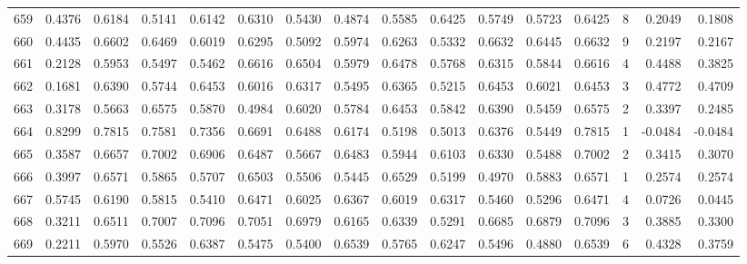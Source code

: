 \begin{tabular}{lrrrrrrrrrrrrrrr}
659 &      0.4376 &  0.6184 &  0.5141 &  0.6142 &  0.6310 &  0.5430 &  0.4874 &  0.5585 &  0.6425 &  0.5749 &   0.5723 &     0.6425 &      8 &                    0.2049 &                     0.1808 \\
660 &      0.4435 &  0.6602 &  0.6469 &  0.6019 &  0.6295 &  0.5092 &  0.5974 &  0.6263 &  0.5332 &  0.6632 &   0.6445 &     0.6632 &      9 &                    0.2197 &                     0.2167 \\
661 &      0.2128 &  0.5953 &  0.5497 &  0.5462 &  0.6616 &  0.6504 &  0.5979 &  0.6478 &  0.5768 &  0.6315 &   0.5844 &     0.6616 &      4 &                    0.4488 &                     0.3825 \\
662 &      0.1681 &  0.6390 &  0.5744 &  0.6453 &  0.6016 &  0.6317 &  0.5495 &  0.6365 &  0.5215 &  0.6453 &   0.6021 &     0.6453 &      3 &                    0.4772 &                     0.4709 \\
663 &      0.3178 &  0.5663 &  0.6575 &  0.5870 &  0.4984 &  0.6020 &  0.5784 &  0.6453 &  0.5842 &  0.6390 &   0.5459 &     0.6575 &      2 &                    0.3397 &                     0.2485 \\
664 &      0.8299 &  0.7815 &  0.7581 &  0.7356 &  0.6691 &  0.6488 &  0.6174 &  0.5198 &  0.5013 &  0.6376 &   0.5449 &     0.7815 &      1 &                   -0.0484 &                    -0.0484 \\
665 &      0.3587 &  0.6657 &  0.7002 &  0.6906 &  0.6487 &  0.5667 &  0.6483 &  0.5944 &  0.6103 &  0.6330 &   0.5488 &     0.7002 &      2 &                    0.3415 &                     0.3070 \\
666 &      0.3997 &  0.6571 &  0.5865 &  0.5707 &  0.6503 &  0.5506 &  0.5445 &  0.6529 &  0.5199 &  0.4970 &   0.5883 &     0.6571 &      1 &                    0.2574 &                     0.2574 \\
667 &      0.5745 &  0.6190 &  0.5815 &  0.5410 &  0.6471 &  0.6025 &  0.6367 &  0.6019 &  0.6317 &  0.5460 &   0.5296 &     0.6471 &      4 &                    0.0726 &                     0.0445 \\
668 &      0.3211 &  0.6511 &  0.7007 &  0.7096 &  0.7051 &  0.6979 &  0.6165 &  0.6339 &  0.5291 &  0.6685 &   0.6879 &     0.7096 &      3 &                    0.3885 &                     0.3300 \\
669 &      0.2211 &  0.5970 &  0.5526 &  0.6387 &  0.5475 &  0.5400 &  0.6539 &  0.5765 &  0.6247 &  0.5496 &   0.4880 &     0.6539 &      6 &                    0.4328 &                     0.3759 \\

\end{tabular}
